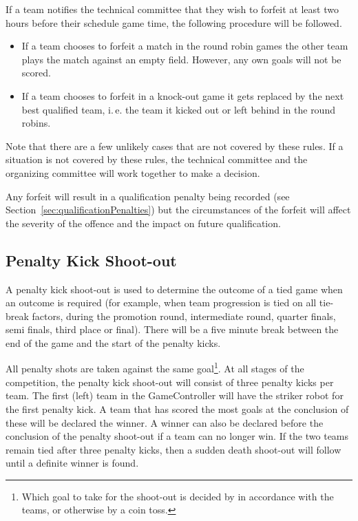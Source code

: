 \documentclass[12pt]{article}
\newcommand{\ie}{\mbox{i.\,e.}\xspace}
\newcommand{\cf}{see\xspace}
\begin{document}
If a team notifies the technical committee that they wish to forfeit at least two hours before their schedule game time, the following procedure will be followed.

\begin{itemize}
\item If a team chooses to forfeit a match in the round robin games the other team plays the match against an empty field.  However, any own goals will not be scored.
\item If a team chooses to forfeit in a knock-out game it gets replaced by the next best qualified team, \ie the team it kicked out or left behind in the round robins.
\end{itemize}

Note that there are a few unlikely cases that are not covered by these rules.  If a situation is not covered by these rules, the technical committee and the organizing committee will work together to make a decision.

Any forfeit will result in a qualification penalty being recorded (\cf Section~\ref{sec:qualificationPenalties}) but the circumstances of the forfeit will affect the severity of the offence and the impact on future qualification.

\subsection{Penalty Kick Shoot-out}
\label{sec:penalty_shoot-out}

A penalty kick shoot-out is used to determine the outcome of a tied game when an outcome is required (for example, when team progression is tied on all tie-break factors, during the promotion round, intermediate round, quarter finals, semi finals, third place or final).
There will be a five minute break between the end of the game and the start of the penalty kicks.

All penalty shots are taken against the same goal\footnote{Which goal to take for the shoot-out is decided by in accordance with the teams, or otherwise by a coin toss.}.
At all stages of the competition, the penalty kick shoot-out will consist of three penalty kicks per team.
The first (left) team in the GameController will have the striker robot for the first penalty kick.
A team that has scored the most goals at the conclusion of these will be declared the winner. A winner can also be declared before the conclusion of the penalty shoot-out if a team can no longer win. If the two teams remain tied after three penalty kicks, then a sudden death shoot-out will follow until a definite winner is found.
\end{document}
